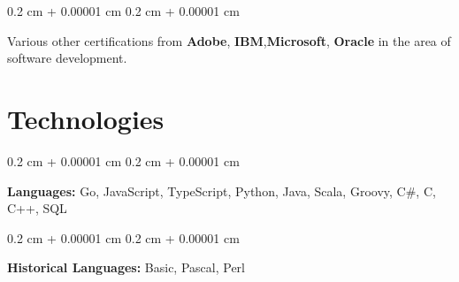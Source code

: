 \documentclass[10pt, a4paper]{article}
\newenvironment{onecolentry}{
    \begin{adjustwidth}{
        0.2 cm + 0.00001 cm
    }{
        0.2 cm + 0.00001 cm
    }
}{
    \end{adjustwidth}
} %
\begin{document}
\begin{onecolentry}
    Various other certifications from \textbf{Adobe}, \textbf{IBM},\textbf{Microsoft}, \textbf{Oracle} in the area of software development.
\end{onecolentry}

\vspace{0.20 cm}


%
%
\section{Technologies}

\begin{onecolentry}
    \textbf{Languages:} Go, JavaScript, TypeScript, Python, Java, Scala, Groovy, C\#, C, C++, SQL
\end{onecolentry}

\vspace{0.2 cm}

\begin{onecolentry}
    \textbf{Historical Languages:} Basic, Pascal, Perl
\end{onecolentry}
\end{document}
